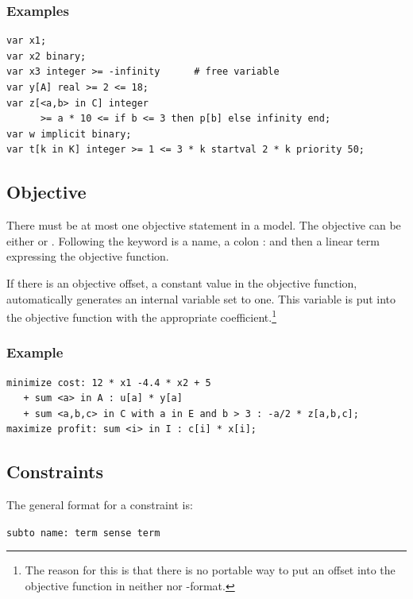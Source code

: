 \subsubsection{Examples}
{\small
\begin{verbatim}
var x1;
var x2 binary;
var x3 integer >= -infinity      # free variable
var y[A] real >= 2 <= 18;
var z[<a,b> in C] integer
      >= a * 10 <= if b <= 3 then p[b] else infinity end;
var w implicit binary;
var t[k in K] integer >= 1 <= 3 * k startval 2 * k priority 50;
\end{verbatim}
}



\subsection{Objective}
There must be at most one objective statement in a model. The objective
can be either  or . Following the
keyword is a name, a colon : and then a linear term expressing the
objective function.

If there is an objective offset, \ie a constant value in the
objective function, \zimpl automatically generates an internal
variable  set to one. This variable is put into the
objective function with the appropriate coefficient.\footnote{The reason for
this is that there is no portable way to put an offset into the
objective function in neither \lpf nor \mps-format.}

\subsubsection{Example}
{\small
\begin{verbatim}
minimize cost: 12 * x1 -4.4 * x2 + 5
   + sum <a> in A : u[a] * y[a]
   + sum <a,b,c> in C with a in E and b > 3 : -a/2 * z[a,b,c];
maximize profit: sum <i> in I : c[i] * x[i];
\end{verbatim}
}

\subsection{Constraints}\label{ssec:ug:constraints}
The general format for a constraint is:

\smallskip
\verb|subto name: term sense term|

